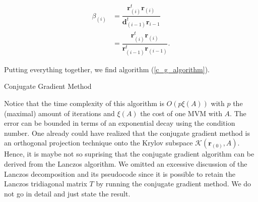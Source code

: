 \documentclass[12pt,a4paper,oneside]{book}
\makeatletter
\def\BState{\State\hskip-\ALG@thistlm}
\makeatother
\begin{document}
\begin{align}
\beta_{(i)} &= \dfrac{\bm{r}_{(i)}^t  \bm{r}_{(i)}}{\bm{d}^t_{(i-1)} \bm{r}_{i-1}}  \nonumber \\
&= \dfrac{\bm{r}_{(i)}^t  \bm{r}_{(i)}}{\bm{r}_{(i-1)}^t  \bm{r}_{(i-1)}}.
\end{align}

Putting everything together, we find algorithm (\ref{c_g_algorithm}).


\begin{algorithm}
\caption{Conjugate Gradient Method}\label{c_g_algorithm}
\end{algorithm}

Notice that the time complexity of this algorithm is $O(p\xi (A))$ with $p$ the (maximal) amount of iterations and $\xi(A)$ the cost of one MVM with $A$. The error can be bounded in terms of an exponential decay using the condition number.  One already could have realized that the conjugate gradient method is an orthogonal projection technique onto the Krylov subspace $\mathcal{K}(\bm{r}_{(0)}, A)$. Hence, it is maybe not so suprising that the conjugate gradient algorithm can be derived from the Lanczos algorithm. We omitted an excessive discussion of the Lanczos decomposition and its pseudocode since it is possible to retain the Lanczos tridiagonal matrix $T$ by running the conjugate gradient method. We do not go in detail and just state the result. 
\end{document}
